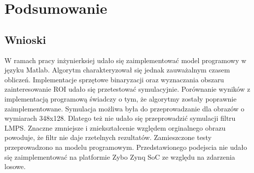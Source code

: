 \chapter{Podsumowanie}

\section{Wnioski}
W ramach pracy inżynierksiej udało się zaimplementować model programowy w języku Matlab. 
Algorytm charakteryzował się jednak zauważalnym czasem obliczeń. Implementacje sprzętowe binaryzacji oraz wyznaczania obszaru zainteresowanie ROI udało się przetestować symulacyjnie. Porównanie wyników z implementacją programową świadczy o tym, że algorytmy zostały poprawnie zaimplementowane.
Symulacja możliwa była do przeprowadzanie dla obrazów o wymiarach 348x128. Dlatego też nie udało się przeprowadzić symulacji filtru LMPS. Znaczne zmniejsze i zniekształcenie względem orginalnego obrazu powoduje, że filtr nie daje rzetelnych rezultatów. Zamieszczone testy przeprowadzono na modelu programowym.
Przedstawionego podejscia nie udało się zaimplementować na platformie Zybo Zynq SoC ze względu na zdarzenia losowe.

